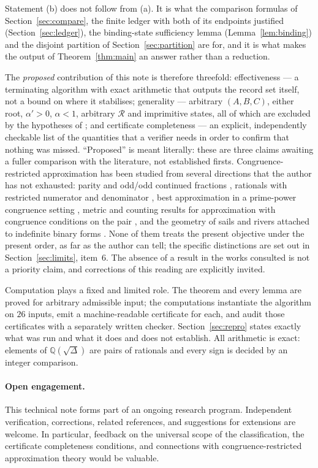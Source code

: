 \documentclass[11pt]{article}
\theoremstyle{definition}
\theoremstyle{remark}
\newcommand{\Q}{\mathbb{Q}}
\begin{document}
Statement (b) does not follow from (a). It is what the comparison formulas of
Section~\ref{sec:compare}, the finite ledger with both of its endpoints justified
(Section~\ref{sec:ledger}), the binding-state sufficiency lemma
(Lemma~\ref{lem:binding}) and the disjoint partition of Section~\ref{sec:partition} are for, and
it is what makes the output of Theorem~\ref{thm:main} an answer rather than a reduction.

The \emph{proposed} contribution of this note is therefore threefold: effectiveness --- a
terminating algorithm with exact arithmetic that outputs the record set itself, not a bound on
where it stabilises; generality --- arbitrary $(A,B,C)$, either root, $\alpha'>0$, $\alpha<1$,
arbitrary $\mathcal R$ and imprimitive states, all of which are excluded by the hypotheses of
\cite{DeJesus2026oddodd}; and certificate completeness --- an explicit, independently
checkable list of the quantities that a verifier needs in order to confirm that nothing was
missed. ``Proposed'' is meant literally: these are three claims awaiting a fuller comparison
with the literature, not established firsts. Congruence-restricted approximation has been studied from several
directions that the author has not exhausted: parity and odd/odd continued fractions
\cite{KimLeeLiao2022,KimLeeLiao2025}, rationals with restricted numerator and denominator
\cite{Elsner2000}, best approximation in a prime-power congruence setting
\cite{KushwahaSarma}, metric and counting results for approximation with congruence conditions
on the pair \cite{HanLee2025}, and the geometry of sails and rivers attached to indefinite
binary forms \cite{Karpenkov2013,SpaldingVeselov}. None of them treats the present objective
under the present order, as far as the author can tell; the specific distinctions are set out in
Section~\ref{sec:limits}, item~6. The absence of a result in the works consulted is not a
priority claim, and corrections of this reading are explicitly invited.

Computation plays a fixed and limited role. The theorem and every lemma are proved for
arbitrary admissible input; the computations instantiate the algorithm on $26$ inputs, emit a
machine-readable certificate for each, and audit those certificates with a separately written
checker. Section~\ref{sec:repro} states exactly what was run and what it does and does not
establish. All arithmetic is exact: elements of $\Q(\sqrt\Delta)$ are pairs of rationals and
every sign is decided by an integer comparison.

\paragraph{Open engagement.}
This technical note forms part of an ongoing research program. Independent verification,
corrections, related references, and suggestions for extensions are welcome. In particular,
feedback on the universal scope of the classification, the certificate completeness conditions,
and connections with congruence-restricted approximation theory would be valuable.
\end{document}
